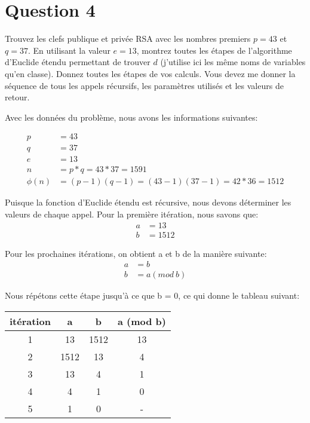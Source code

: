 \documentclass[devoir4.tex]{subfiles}
\begin{document}
\section*{Question 4}
Trouvez les clefs publique et privée RSA avec les nombres premiers \(p = 43\) et \(q = 37\). En utilisant la valeur \(e = 13\), montrez toutes les étapes de l'algorithme d'Euclide étendu permettant de trouver \(d\) (j'utilise ici les même noms de variables qu'en classe). Donnez toutes les étapes de vos calculs. Vous devez me donner la séquence de tous les appels récursifs, les paramètres utilisés et les valeurs de retour. \newline

Avec les données du problème, nous avons les informations suivantes:

\begin{align*}
	p &= 43 \\
	q &= 37 \\
	e &= 13 \\
	n &= p*q = 43 * 37 = 1591 \\
	\phi(n) &= (p-1)(q-1) = (43-1)(37-1) = 42*36 = 1512
\end{align*}

Puisque la fonction d'Euclide étendu est récursive, nous devons déterminer les valeurs de chaque appel. Pour la première itération, nous savons que:
\begin{align*}
	a &= 13 \\
	b &= 1512
\end{align*}

Pour les prochaines itérations, on obtient a et b de la manière suivante:
\begin{align*}
	a &= b \\
	b &= a (mod \: b)
\end{align*}

Nous répétons cette étape jusqu'à ce que b = 0, ce qui donne le tableau suivant:

\begin{table}[H]
	\centering
	\vspace{0.5cm}
	\begin{tabular}{|c|c|c|c|}
		\hline
		itération 	& a 	  & b 		& a (mod b) 	\\ \hline
		1     		& 13     & 1512	& 13     	\\ \hline
		2    		& 1512 & 13		&  4     	\\ \hline
		3     		& 13     & 4		&  1  		\\ \hline
		4     		& 4       & 1              &  0  		\\ \hline
		5     		& 1       & 0              &  -   		\\ \hline

	\end{tabular}
\end{table}
\end{document}
